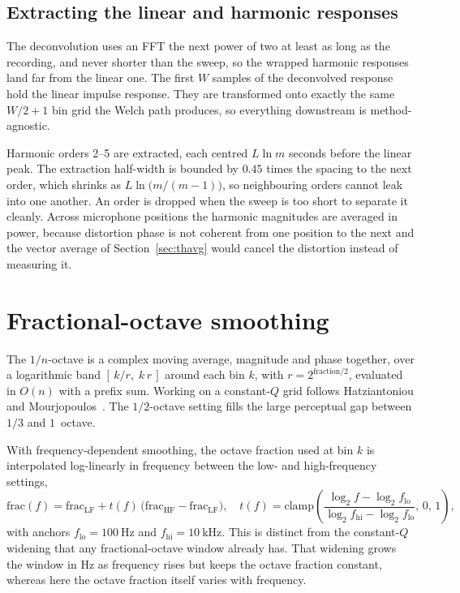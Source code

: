 \subsection{Extracting the linear and harmonic responses}
The deconvolution uses an FFT the next power of two at least as long as the recording, and never shorter than the sweep, so the wrapped harmonic responses land far from the linear one. The first $W$ samples of the deconvolved response hold the linear impulse response. They are transformed onto exactly the same $W/2+1$ bin grid the Welch path produces, so everything downstream is method-agnostic.

Harmonic orders \numrange{2}{5} are extracted, each centred $L \ln m$ seconds before the linear peak. The extraction half-width is bounded by $0.45$ times the spacing to the next order, which shrinks as $L \ln\!\big(m/(m-1)\big)$, so neighbouring orders cannot leak into one another. An order is dropped when the sweep is too short to separate it cleanly. Across microphone positions the harmonic magnitudes are averaged in power, because distortion phase is not coherent from one position to the next and the vector average of Section~\ref{sec:thavg} would cancel the distortion instead of measuring it.

\section{Fractional-octave smoothing}\label{sec:thsmooth}
The $1/n$-octave  is a complex moving average, magnitude and phase together, over a logarithmic band $[\,k/r,\;k\,r\,]$ around each bin $k$, with $r = 2^{\text{fraction}/2}$, evaluated in $O(n)$ with a prefix sum. Working on a constant-$Q$ grid follows Hatziantoniou and Mourjopoulos~\cite{Hatziantoniou2000}. The $1/2$-octave setting fills the large perceptual gap between $1/3$ and $1$~octave.

With frequency-dependent smoothing, the octave fraction used at bin $k$ is interpolated log-linearly in frequency between the low- and high-frequency settings,
\begin{equation}
  \mathrm{frac}(f) = \mathrm{frac}_{\mathrm{LF}}
    + t(f)\,\bigl(\mathrm{frac}_{\mathrm{HF}}-\mathrm{frac}_{\mathrm{LF}}\bigr),
  \quad
  t(f) = \mathrm{clamp}\!\left(\frac{\log_2 f - \log_2 f_{\mathrm{lo}}}
                                     {\log_2 f_{\mathrm{hi}} - \log_2 f_{\mathrm{lo}}},\,0,\,1\right),
\end{equation}
with anchors $f_{\mathrm{lo}}=\SI{100}{\hertz}$ and $f_{\mathrm{hi}}=\SI{10}{\kHz}$. This is distinct from the constant-$Q$ widening that any fractional-octave window already has. That widening grows the window in \si{\hertz} as frequency rises but keeps the octave fraction constant, whereas here the octave fraction itself varies with frequency.

